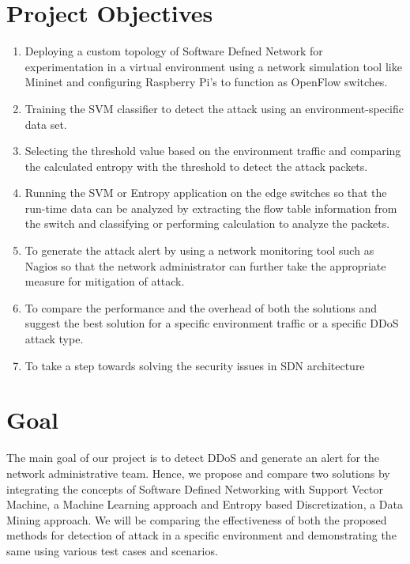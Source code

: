 \documentclass[12pt,a4paper,final]{report}
\begin{document}
\section{Project Objectives}
\begin{enumerate}
\item
Deploying a custom topology of Software Defned Network for experimentation in a virtual environment using a network simulation tool like Mininet and configuring Raspberry Pi's to function as OpenFlow switches.

\item
Training the SVM classifier to detect the attack using an environment-specific data set.

\item
Selecting the threshold value based on the environment traffic and comparing the calculated entropy with the threshold to detect the attack packets.

\item
Running the SVM or Entropy application on the edge switches so that the run-time data can be analyzed by extracting the flow table information from the switch and classifying or performing calculation to analyze the packets.

\item
To generate the attack alert by using a network monitoring tool such as Nagios so that the network administrator can further take the appropriate measure for mitigation of attack.

\item
To compare the performance and the overhead of both the solutions and suggest the best solution for a specific environment traffic or a specific DDoS attack type.

\item
To take a step towards solving the security issues in SDN architecture
\end{enumerate}

\section{Goal}
The main goal of our project is to detect DDoS and generate an alert for the network administrative team. Hence, we propose and compare two solutions by integrating the concepts of Software Defined Networking with Support Vector Machine, a Machine Learning approach and Entropy based Discretization, a Data Mining approach. We will be comparing the effectiveness of both the proposed methods for detection of attack in a specific environment and demonstrating the same using various test cases and scenarios.
\end{document}
